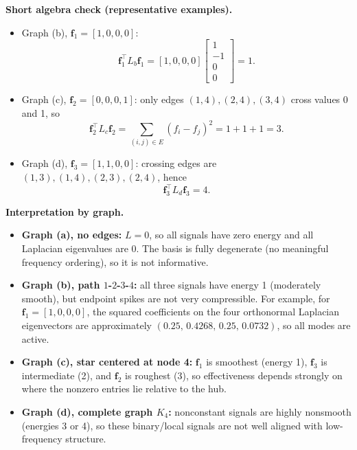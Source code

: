 \documentclass[11pt]{article}
\begin{document}
\noindent\textbf{Short algebra check (representative examples).}
\begin{itemize}[leftmargin=1.2em]
\item Graph (b), \(\mathbf{f}_1=[1,0,0,0]\):
\[
\mathbf{f}_1^\top L_b \mathbf{f}_1
=[1,0,0,0]
\begin{bmatrix}1\\-1\\0\\0\end{bmatrix}
=1.
\]
\item Graph (c), \(\mathbf{f}_2=[0,0,0,1]\): only edges \((1,4),(2,4),(3,4)\) cross values 0 and 1, so
\[
\mathbf{f}_2^\top L_c \mathbf{f}_2=\sum_{(i,j)\in E}(f_i-f_j)^2=1+1+1=3.
\]
\item Graph (d), \(\mathbf{f}_3=[1,1,0,0]\): crossing edges are \((1,3),(1,4),(2,3),(2,4)\), hence
\[
\mathbf{f}_3^\top L_d \mathbf{f}_3=4.
\]
\end{itemize}

\noindent\textbf{Interpretation by graph.}
\begin{itemize}[leftmargin=1.2em]
\item \textbf{Graph (a), no edges:} $L=0$, so all signals have zero energy and all Laplacian eigenvalues are 0. The basis is fully degenerate (no meaningful frequency ordering), so it is not informative.
\item \textbf{Graph (b), path $1$-$2$-$3$-$4$:} all three signals have energy 1 (moderately smooth), but endpoint spikes are not very compressible. For example, for \(\mathbf{f}_1=[1,0,0,0]\), the squared coefficients on the four orthonormal Laplacian eigenvectors are approximately \((0.25,\,0.4268,\,0.25,\,0.0732)\), so all modes are active.
\item \textbf{Graph (c), star centered at node 4:} $\mathbf{f}_1$ is smoothest (energy 1), $\mathbf{f}_3$ is intermediate (2), and $\mathbf{f}_2$ is roughest (3), so effectiveness depends strongly on where the nonzero entries lie relative to the hub.
\item \textbf{Graph (d), complete graph $K_4$:} nonconstant signals are highly nonsmooth (energies 3 or 4), so these binary/local signals are not well aligned with low-frequency structure.
\end{itemize}
\end{document}
